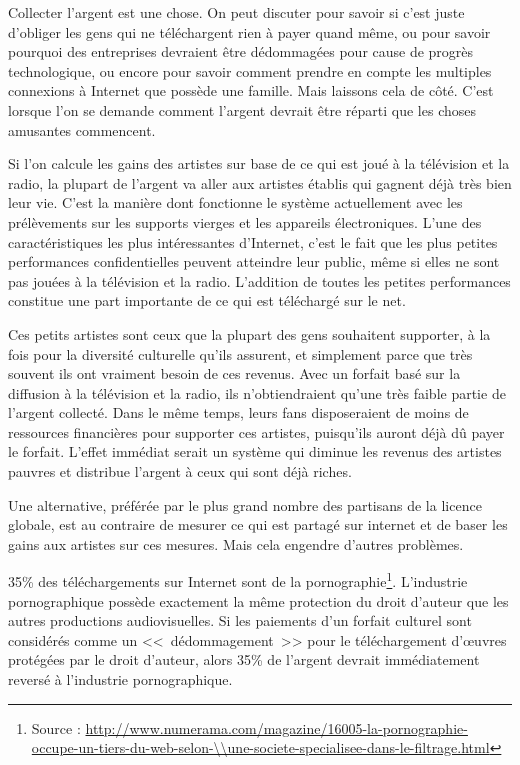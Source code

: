 Collecter l'argent est une chose. On peut discuter pour savoir si c'est juste d'obliger les gens qui ne téléchargent rien à payer quand même, ou pour savoir pourquoi des entreprises devraient être dédommagées pour cause de progrès technologique, ou encore pour savoir comment prendre en compte les multiples connexions à Internet que possède une famille.
Mais laissons cela de côté.
C'est lorsque l'on se demande comment l'argent devrait être réparti que les choses amusantes commencent.

Si l'on calcule les gains des artistes sur base de ce qui est joué à la télévision et la radio, la plupart de l'argent va aller aux artistes établis qui gagnent déjà très bien leur vie.
C'est la manière dont fonctionne le système actuellement avec les prélèvements sur les supports vierges et les appareils électroniques.
L'une des caractéristiques les plus intéressantes d'Internet, c'est le fait que les plus petites performances confidentielles peuvent atteindre leur public, même si elles ne sont pas jouées à la télévision et la radio. L'addition de toutes les petites performances constitue une part importante de ce qui est téléchargé sur le net.

Ces petits artistes sont ceux que la plupart des gens souhaitent supporter, à la fois pour la diversité culturelle qu'ils assurent, et simplement parce que très souvent ils ont vraiment besoin de ces revenus.
Avec un forfait basé sur la diffusion à la télévision et la radio, ils n'obtiendraient qu'une très faible partie de l'argent collecté.
Dans le même temps, leurs fans disposeraient de moins de ressources financières pour supporter ces artistes, puisqu'ils auront déjà dû payer le forfait.
L'effet immédiat serait un système qui diminue les revenus des artistes pauvres et distribue l'argent à ceux qui sont déjà riches.

Une alternative, préférée par le plus grand nombre des partisans de la licence globale, est au contraire de mesurer ce qui est partagé sur internet et de baser les gains aux artistes sur ces mesures. Mais cela engendre d'autres problèmes.

35\% des téléchargements sur Internet sont de la pornographie\footnote{Source : \url{http://www.numerama.com/magazine/16005-la-pornographie-occupe-un-tiers-du-web-selon-\\une-societe-specialisee-dans-le-filtrage.html}}.
L'industrie pornographique possède exactement la même protection du droit d'auteur que les autres productions audiovisuelles.
Si les paiements d'un forfait culturel sont considérés comme un <<~dédommagement~>> pour le téléchargement d'œuvres protégées par le droit d'auteur, alors 35\% de l'argent devrait immédiatement reversé à l'industrie pornographique.

